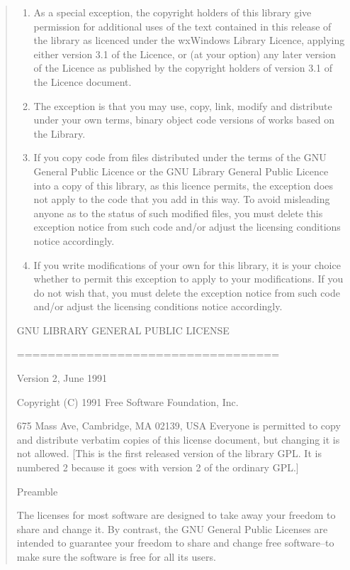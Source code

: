 \documentclass[
]{book}
\theoremstyle{definition}
\theoremstyle{definition}
\theoremstyle{definition}
\theoremstyle{definition}
\theoremstyle{remark}
\begin{document}
\begin{quote}
\begin{enumerate}
\def\labelenumi{\arabic{enumi}.}
\item
  As a special exception, the copyright holders of this library give
  permission for additional uses of the text contained in this release of
  the library as licenced under the wxWindows Library Licence, applying
  either version 3.1 of the Licence, or (at your option) any later version of
  the Licence as published by the copyright holders of version
  3.1 of the Licence document.
\item
  The exception is that you may use, copy, link, modify and distribute
  under your own terms, binary object code versions of works based
  on the Library.
\item
  If you copy code from files distributed under the terms of the GNU
  General Public Licence or the GNU Library General Public Licence into a
  copy of this library, as this licence permits, the exception does not
  apply to the code that you add in this way. To avoid misleading anyone as
  to the status of such modified files, you must delete this exception
  notice from such code and/or adjust the licensing conditions notice
  accordingly.
\item
  If you write modifications of your own for this library, it is your
  choice whether to permit this exception to apply to your modifications.
  If you do not wish that, you must delete the exception notice from such
  code and/or adjust the licensing conditions notice accordingly.
\end{enumerate}

GNU LIBRARY GENERAL PUBLIC LICENSE

==================================

Version 2, June 1991

Copyright (C) 1991 Free Software Foundation, Inc.

675 Mass Ave, Cambridge, MA 02139, USA
Everyone is permitted to copy and distribute verbatim copies
of this license document, but changing it is not allowed.
{[}This is the first released version of the library GPL. It is
numbered 2 because it goes with version 2 of the ordinary GPL.{]}

Preamble

The licenses for most software are designed to take away your
freedom to share and change it. By contrast, the GNU General
Public Licenses are intended to guarantee your freedom to share
and change free software--to make sure the software is free for
all its users.


\end{quote}
\end{document}
